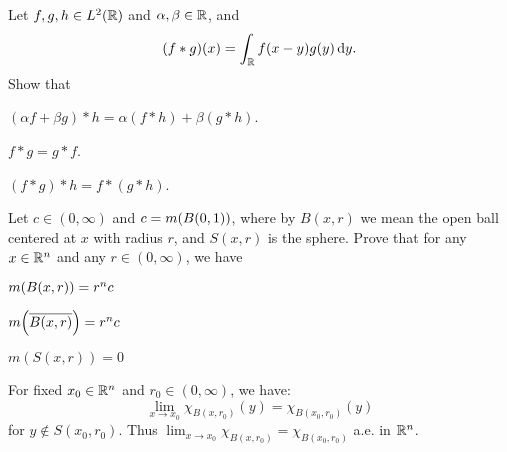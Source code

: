 \documentclass{../homework}
\begin{document}
\begin{problems}
\item Let \(f, g, h \in L^2(\mathbb R)\) and \(\alpha, \beta \in \mathbb R\), and
  \[
    (f*g)(x) = \int_\mathbb R f(x-y) g(y) \mathop{}\!\mathrm d y.
  \]
  Show that
  \begin{problems}
  \item \((\alpha f + \beta g)*h = \alpha(f*h) + \beta(g*h)\).

    \begin{solution}
    \end{solution}

  \item \(f*g=g*f\).

    \begin{solution}
    \end{solution}

  \item \((f*g)*h = f*(g*h)\).

    \begin{solution}
    \end{solution}

  \end{problems}

\item Let \(c \in (0, \infty)\) and \(c = m\prn*{B(0, 1)}\), where by
  \(B(x, r)\) we mean the open ball centered at \(x\) with radius
  \(r\), and \(S(x, r)\) is the sphere.  Prove that for any
  \(x \in \mathbb R^n\) and any \(r \in (0, \infty)\), we have
  \begin{problems}
  \item \(m\prn*{B(x, r)} = r^n c\)

    \begin{solution}
    \end{solution}

  \item \(m\prn*{\overline{B(x, r)}} = r^n c\)

    \begin{solution}
    \end{solution}

  \item \(m(S(x, r)) = 0\)

    \begin{solution}
    \end{solution}

  \item For fixed \(x_0 \in \mathbb R^n\) and \(r_0 \in (0, \infty)\), we
    have:
    \[
      \lim_{x \to x_0} \chi_{B(x, r_0)}(y) = \chi_{B(x_0, r_0)}(y)
    \]
    for \(y \notin S(x_0, r_0)\).  Thus
    \(\lim_{x \to x_0} \chi_{B(x, r_0)} = \chi_{B(x_0, r_0)}\) a.e. in
    \(\mathbb R^n\).


\end{problems}
\end{problems}
\end{document}
